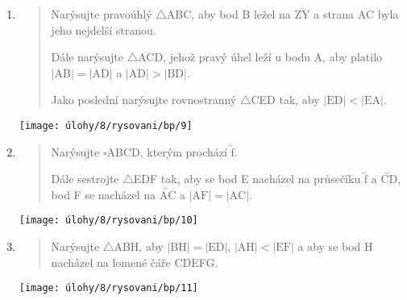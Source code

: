\begin{enumerate}
\begin{minipage}[t]{\linewidth}
    \end{minipage}

    \item
    \begin{minipage}[t]{\linewidth}
        \begin{quote}
            Narýsujte pravoúhlý $\triangle$ABC, aby bod B ležel na $\overline{\text{ZY}}$ a strana AC byla jeho nejdelší stranou.

            Dále narýsujte $\triangle$ACD, jehož pravý úhel leží u bodu A, aby platilo $\lvert \text{AB} \rvert = \lvert \text{AD} \rvert$ a $\lvert \text{AD} \rvert > \lvert \text{BD} \rvert$.

            Jako poslední narýsujte rovnostranný $\triangle$CED tak, aby ${\lvert \text{ED} \rvert < \lvert \text{EA} \rvert}$.
        \end{quote}
        \centering
        \texttt{[image: úlohy/8/rysovani/bp/9]}

    \end{minipage}

    \item
    \begin{minipage}[t]{\linewidth}
        \begin{quote}
            Narýsujte $\square$ABCD, kterým prochází $\overleftrightarrow{\text{f}}$.

            Dále sestrojte $\triangle$EDF tak, aby se bod E nacházel na průsečíku $\overleftrightarrow{\text{f}}$ a $\overleftrightarrow{\text{CD}}$, bod F se nacházel na $\overleftrightarrow{\text{AC}}$ a $\lvert \text{AF} \rvert = \lvert \text{AC} \rvert$.
        \end{quote}
        \centering
        \texttt{[image: úlohy/8/rysovani/bp/10]}

    \end{minipage}

    \item
    \begin{minipage}[t]{\linewidth}
        \begin{quote}
            Narýsujte $\triangle$ABH, aby $\lvert \text{BH} \rvert = \lvert \text{ED} \rvert$, $\lvert \text{AH} \rvert < \lvert \text{EF} \rvert$ a aby se bod H nacházel na lomené čáře CDEFG\@.
        \end{quote}
        \centering
        \texttt{[image: úlohy/8/rysovani/bp/11]}

    \end{minipage}
\end{enumerate}


